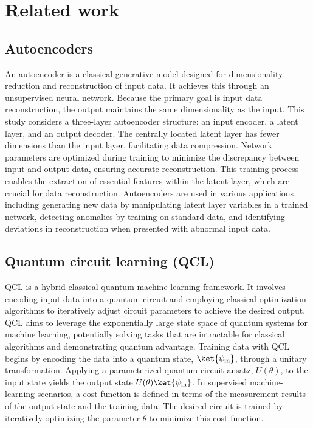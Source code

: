 \section{Related work}
\label{sec2}

\subsection{Autoencoders}
An autoencoder is a classical generative model designed for dimensionality reduction and reconstruction of input data\citep{Hinton_2006}. It achieves this through an unsupervised neural network. Because the primary goal is input data reconstruction, the output maintains the same dimensionality as the input. This study considers a three-layer autoencoder structure: an input encoder, a latent layer, and an output decoder. The centrally located latent layer has fewer dimensions than the input layer, facilitating data compression. Network parameters are optimized during training to minimize the discrepancy between input and output data, ensuring accurate reconstruction. This training process enables the extraction of essential features within the latent layer, which are crucial for data reconstruction. Autoencoders are used in various applications, including generating new data by manipulating latent layer variables in a trained network, detecting anomalies by training on standard data, and identifying deviations in reconstruction when presented with abnormal input data.

\subsection{Quantum circuit learning (QCL)}
QCL is a hybrid classical-quantum machine-learning framework\citep{Mitarai_2018}. It involves encoding input data into a quantum circuit and employing classical optimization algorithms to iteratively adjust circuit parameters to achieve the desired output. QCL aims to leverage the exponentially large state space of quantum systems for machine learning, potentially solving tasks that are intractable for classical algorithms and demonstrating quantum advantage. Training data with QCL begins by encoding the data into a quantum state, $\ket{\psi_{\text{in}}}$, through a unitary transformation. Applying a parameterized quantum circuit ansatz, $U(\theta)$, to the input state yields the output state $U(\theta)\ket{\psi_{\text{in}}}$. In supervised machine-learning scenarios, a cost function is defined in terms of the measurement results of the output state and the training data. The desired circuit is trained by iteratively optimizing the parameter $\theta$ to minimize this cost function.

